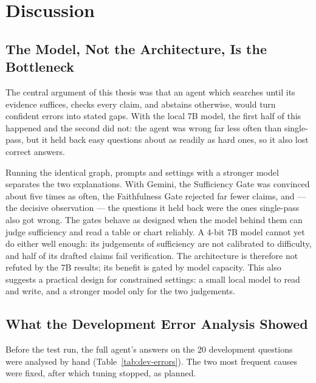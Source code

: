 \chapter{Discussion}
\label{sec:discussion}

\section{The Model, Not the Architecture, Is the Bottleneck}

The central argument of this thesis was that an agent which searches until its
evidence suffices, checks every claim, and abstains otherwise, would turn confident
errors into stated gaps. With the local 7B model, the first half of this happened and
the second did not: the agent was wrong far less often than single-pass, but it held
back easy questions about as readily as hard ones, so it also lost correct answers.

Running the identical graph, prompts and settings with a stronger model separates the
two explanations. With Gemini, the Sufficiency Gate was convinced about five times as
often, the Faithfulness Gate rejected far fewer claims, and --- the decisive
observation --- the questions it held back were the ones single-pass also got wrong.
The gates behave as designed when the model behind them can judge sufficiency and
read a table or chart reliably. A 4-bit 7B model cannot yet do either well enough:
its judgements of sufficiency are not calibrated to difficulty, and half of its drafted
claims fail verification. The architecture is therefore not refuted by the 7B
results; its benefit is gated by model capacity. This also suggests a practical design
for constrained settings: a small local model to read and write, and a stronger model
only for the two judgements.

\section{What the Development Error Analysis Showed}

Before the test run, the full agent's answers on the 20 development questions were
analysed by hand (Table~\ref{tab:dev-errors}). The two most frequent causes were fixed,
after which tuning stopped, as planned.

